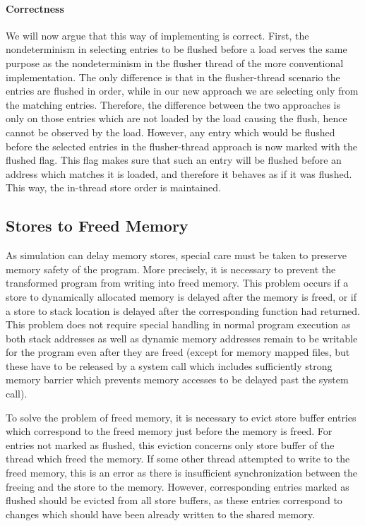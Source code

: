 \paragraph{Correctness}%
%
We will now argue that this way of implementing \xtso is correct.
First, the nondeterminism in selecting entries to be flushed before a load serves the same purpose as the nondeterminism in the flusher thread of the more conventional implementation.
The only difference is that in the flusher-thread scenario the entries are
flushed in order, while in our new approach we are selecting only from the matching entries.
Therefore, the difference between the two approaches is only on those entries
which are not loaded by the load causing the flush, hence cannot be observed by the load.
However, any entry which would be flushed before the selected entries in the flusher-thread approach is now marked with the flushed flag.
This flag makes sure that such an entry will be flushed before an address which matches it is loaded, and therefore it behaves as if it was flushed.
This way, the in-thread store order is maintained.


\subsection{Stores to Freed Memory}

As \xtso simulation can delay memory stores, special care must be taken to preserve memory safety of the program.
More precisely, it is necessary to prevent the transformed program from writing into freed memory.
This problem occurs if a store to dynamically allocated memory is delayed after the memory is freed, or if a store to stack location is delayed after the corresponding function had returned.
This problem does not require special handling in normal program execution as both stack addresses as well as dynamic memory addresses remain to be writable for the program even after they are freed (except for memory mapped files, but these have to be released by a system call which includes sufficiently strong memory barrier which prevents memory accesses to be delayed past the system call).

To solve the problem of freed memory, it is necessary to evict store buffer entries which correspond to the freed memory just before the memory is freed.
For entries not marked as flushed, this eviction concerns only store buffer of the thread which freed the memory.
If some other thread attempted to write to the freed memory, this is an error as there is insufficient synchronization between the freeing and the store to the memory.
However, corresponding entries marked as flushed should be evicted from all store buffers, as these entries correspond to changes which should have been already written to the shared memory.

